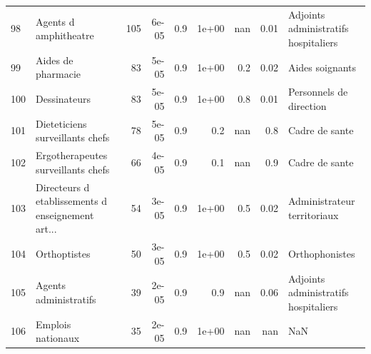 \documentclass[11pt,a4paper]{article}
\begin{document}
\begin{tabular}{llrrrrrrl}
	98  &                              Agents d amphitheatre &            105 &          6e-05 &                    0.9 &              1e+00 &                               nan &                                     0.01 &               Adjoints administratifs hospitaliers \\
	99  &                                 Aides de pharmacie &             83 &          5e-05 &                    0.9 &              1e+00 &                               0.2 &                                     0.02 &                                    Aides soignants \\
	100 &                                       Dessinateurs &             83 &          5e-05 &                    0.9 &              1e+00 &                               0.8 &                                     0.01 &                            Personnels de direction \\
	101 &                    Dieteticiens surveillants chefs &             78 &          5e-05 &                    0.9 &                0.2 &                               nan &                                      0.8 &                                     Cadre de sante \\
	102 &                 Ergotherapeutes surveillants chefs &             66 &          4e-05 &                    0.9 &                0.1 &                               nan &                                      0.9 &                                     Cadre de sante \\
	103 &  Directeurs d etablissements d enseignement art... &             54 &          3e-05 &                    0.9 &              1e+00 &                               0.5 &                                     0.02 &                        Administrateur territoriaux \\
	104 &                                       Orthoptistes &             50 &          3e-05 &                    0.9 &              1e+00 &                               0.5 &                                     0.02 &                                     Orthophonistes \\
	105 &                              Agents administratifs &             39 &          2e-05 &                    0.9 &                0.9 &                               nan &                                     0.06 &               Adjoints administratifs hospitaliers \\
	106 &                                  Emplois nationaux &             35 &          2e-05 &                    0.9 &              1e+00 &                               nan &                                      nan &                                                NaN \\

\end{tabular}
\end{document}
